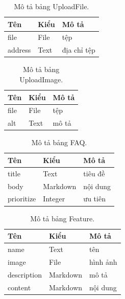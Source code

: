 \documentclass[11pt]{report}
\begin{document}
	
	\begin{table}[h!]
		\begin{center}
			\caption{Mô tả bảng UploadFile.}
			\begin{tabular}{ |l|l|l| } 
				\hline
				Tên & Kiểu & Mô tả \\
				\hline
				file & File & tệp \\
				address & Text & địa chỉ tệp\\ 
				\hline
			\end{tabular}
			\label{table:UploadFile}
		\end{center}
	\end{table}
	
	
	\begin{table}[h!]
		\begin{center}
			\caption{Mô tả bảng UploadImage.}
			\begin{tabular}{ |l|l|l| } 
				\hline
				Tên & Kiểu & Mô tả \\
				\hline
				file & File & tệp \\
				alt & Text & mô tả \\ 
				\hline
			\end{tabular}
			\label{table:UploadImage}
		\end{center}
	\end{table}
	
	
	\begin{table}[h!]
		\begin{center}
			\caption{Mô tả bảng FAQ.}
			\begin{tabular}{ |l|l|l| } 
				\hline
				Tên & Kiểu & Mô tả \\
				\hline
				title & Text & tiêu đề \\
				body & Markdown & nội dung \\
				prioritize & Integer & ưu tiên \\ 
				\hline
			\end{tabular}
			\label{table:FAQ}
		\end{center}
	\end{table}
	
	
	\begin{table}[h!]
		\begin{center}
			\caption{Mô tả bảng Feature.}
			\begin{tabular}{ |l|l|l| } 
				\hline
				Tên & Kiểu & Mô tả \\
				\hline
				name & Text & tên \\
				image & File & hình ảnh \\
				description & Markdown & mô tả \\
				content & Markdown & nội dung \\ 
				\hline
			\end{tabular}
			\label{table:Feature}
		\end{center}
	\end{table}
	
\end{document}
